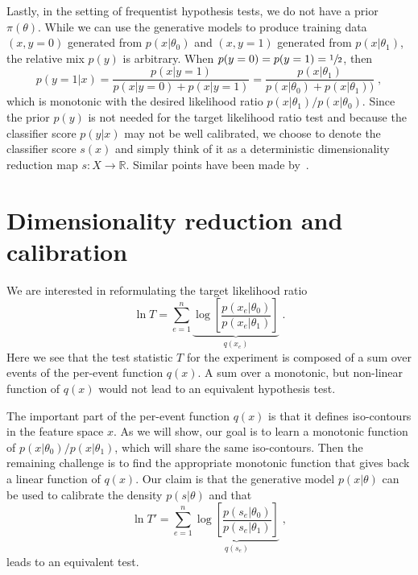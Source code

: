\documentclass{article} %
\begin{document}
Lastly, in the setting of frequentist hypothesis tests, we do not have a prior $\pi(\theta)$. 
While we can use the generative models to produce training data $(x,y=0)$ generated 
from $p(x|\theta_0)$ and $(x,y=1)$ generated from $p(x|\theta_1)$, the relative mix $p(y)$ 
is arbitrary.  When $p(y=0)=p(y=1)=\sfrac{1}{2}$, then 
\begin{equation}
p(y=1 | x) = \frac{p(x|y=1)}{p(x|y=0)+p(x|y=1)} = \frac{p(x|\theta_1)}{p(x|\theta_0)+p(x|\theta_1))} \;,
\end{equation}
which is monotonic with the desired likelihood ratio $p(x|\theta_1)/p(x|\theta_0)$.
Since the prior $p(y)$ is not needed for the target likelihood ratio test and because the classifier score $p(y|x)$ may not be well calibrated, we choose to denote the classifier score $s(x)$ and simply think of it as a deterministic dimensionality reduction map $s: X \to \mathbb{R}$.  Similar points have been made by~\cite{ClaytonScott}.




\section{Dimensionality reduction and calibration}


We are interested in reformulating the target likelihood ratio  
\begin{equation}
\ln T =   \sum_{e=1}^n \underbrace{\log \left[ \frac {p(x_e | \theta_0) }{ p(x_e | \theta_1) } \right]}_{q(x_e)} \;.
\end{equation}
Here we see that the test statistic $T$ for the experiment is composed of a sum over events of the per-event function $q(x)$. A sum over a monotonic, but non-linear function of $q(x)$ would not lead to an equivalent hypothesis test. 

The important part of the per-event function $q(x)$ is that it defines iso-contours in the feature space $x$. As we will show, our goal is to learn a monotonic function of $p(x|\theta_0)/p(x|\theta_1)$, which will share the same iso-contours. Then the remaining challenge is to find the appropriate monotonic function that gives back a linear function of $q(x)$. Our claim is that the generative model $p(x|\theta)$ can be used to calibrate the density $p(s|\theta)$ and that
\begin{equation}
\ln T' = \sum_{e=1}^n \underbrace{\log \left[ \frac {p(s_e | \theta_0) }{ p(s_e | \theta_1) } \right]}_{q(s_e)} \;,
\end{equation}
leads to an equivalent test.
\end{document}
